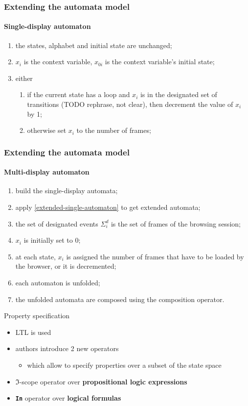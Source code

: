 \documentclass[usenames,dvipsnames]{beamer}
\theoremstyle{definition}
\begin{document}
\begin{frame}
  \frametitle{Extending the automata model}
  \framesubtitle{Single-display automaton}

  \begin{enumerate}
    \item the states, alphabet and initial state are unchanged;
    \item $x_i$ is the context variable, $x_{0i}$ is the context variable's initial state;
    \item either
      \begin{enumerate}
        \item if the current state has a loop and $x_i$ is in the designated set of transitions (TODO rephrase, not clear), then decrement the value of $x_i$ by 1;
        \item otherwise set $x_i$ to the number of frames;
      \end{enumerate}
  \end{enumerate}
\end{frame}


\begin{frame}
  \frametitle{Extending the automata model}
  \framesubtitle{Multi-display automaton}

  \begin{enumerate}
    \item build the single-display automata;
    \item apply \cref{extended-single-automaton} to get extended automata;
    \item the set of designated events $\Sigma^d_i$ is the set of frames of the browsing session;
    \item $x_i$ is initially set to 0;
    \item at each state, $x_i$ is assigned the number of frames that have to be loaded by the browser, or it is decremented;
    \item each automaton is unfolded; %
    \item the unfolded automata are composed using the composition operator.
  \end{enumerate}
\end{frame}


\begin{frame}{Property specification}
  \begin{itemize}
    \item LTL is used
    \item authors introduce 2 new operators
      \begin{itemize}
        \item which allow to specify properties over a subset of the state space
      \end{itemize}
    \item $\mathcal{\Im}$-scope operator over \textbf{propositional logic expressions}
    \item \textbf{\texttt{In}} operator over \textbf{logical formulas}
  \end{itemize}
\end{frame}
\end{document}
